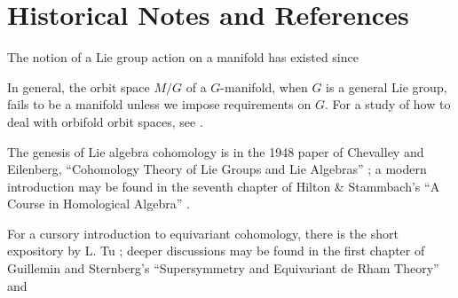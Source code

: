 \section{Historical Notes and References}
The notion of a Lie group action on a manifold has existed since %

In general, the orbit space $M / G$ of a $G$-manifold, when $G$ is a general Lie group, fails to be a manifold unless we impose requirements on $G$. For a study of how to deal with orbifold orbit spaces, see \cite{FIGURE SOMETHING OUT LOOK IT UP}.

The genesis of Lie algebra cohomology is in the 1948 paper of Chevalley and Eilenberg, ``Cohomology Theory of Lie Groups and Lie Algebras'' \cite{chevalleyeilenberg}; a modern introduction may be found in the seventh chapter of Hilton & Stammbach's ``A Course in Homological Algebra'' \cite{HiltonStammbach}.

For a cursory introduction to equivariant cohomology, there is the short expository by L. Tu \cite{tuequivariant};
deeper discussions may be found in the first chapter of Guillemin and Sternberg's ``Supersymmetry and Equivariant de Rham Theory''
and %